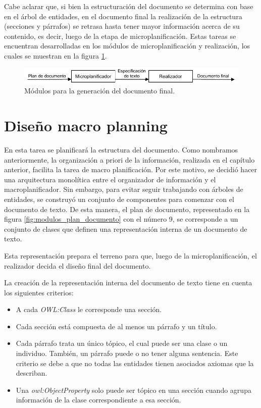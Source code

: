 Cabe aclarar que, si bien la estructuración del documento se determina con base en el árbol de entidades, en el documento final la realización de la estructura (secciones y párrafos) se retrasa hasta tener mayor información acerca de su contenido, es decir, luego de la etapa de microplanificación. Estas tareas se encuentran desarrolladas en los módulos de microplanificación y realización, los cuales se muestran en la figura \ref{fig:modulos_documento_final}.

\begin{figure}[H]
    \centering
    \includegraphics[width=12cm]{img/generacion_documento/modulos_documento_final.pdf}
    \caption{Módulos para la generación del documento final.}
    \label{fig:modulos_documento_final}
\end{figure}

\section{Diseño macro planning}
En esta tarea se planificará la estructura del documento. Como nombramos anteriormente, la organización a priori de la información, realizada en el capítulo anterior, facilita la tarea de macro planificación. Por este motivo, se decidió hacer una arquitectura monolítica entre el organizador de información y el macroplanificador. Sin embargo, para evitar seguir trabajando con árboles de entidades, se construyó un conjunto de componentes para comenzar con el documento de texto. De esta manera, el plan de documento, representado en la figura \ref{fig:modulos_plan_documento} con el número 9, se corresponde a un conjunto de clases que definen una representación interna de un documento de texto. 

Esta representación prepara el terreno para que, luego de la microplanificación, el realizador decida el diseño final del documento.

La creación de la representación interna del documento de texto tiene en cuenta los siguientes criterios:
\begin{itemize}
    \item A cada \emph{OWL:Class} le corresponde una sección.
    \item Cada sección está compuesta de al menos un párrafo y un título.
    \item Cada párrafo trata un único tópico, el cual puede ser una clase o un individuo. También, un párrafo puede o no tener alguna sentencia. Este criterio se debe a que no todas las entidades tienen asociados axiomas que la describan.
    \item Una \emph{owl:ObjectProperty} solo puede ser tópico en una sección cuando agrupa información de la clase correspondiente a esa sección. 
\end{itemize}

